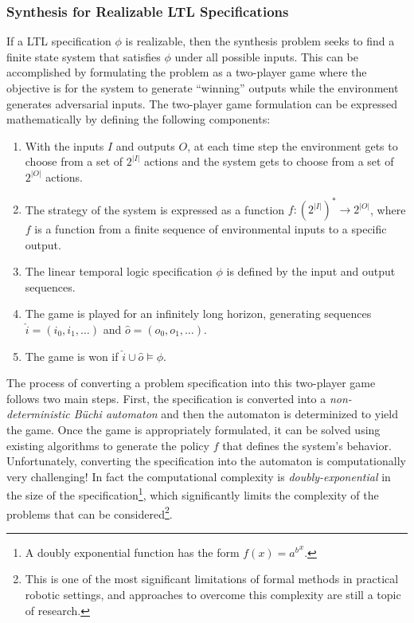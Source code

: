 \subsubsection{Synthesis for Realizable LTL Specifications}
If a LTL specification $\phi$ is realizable, then the synthesis problem seeks to find a finite state system that satisfies $\phi$ under all possible inputs. This can be accomplished by formulating the problem as a two-player game where the objective is for the system to generate ``winning'' outputs while the environment generates adversarial inputs. The two-player game formulation can be expressed mathematically by defining the following components:
\begin{enumerate}
    \item With the inputs $I$ and outputs $O$, at each time step the environment gets to choose from a set of $2^{\lvert I \rvert}$ actions and the system gets to choose from a set of $2^{\lvert O \rvert}$ actions.
    \item The strategy of the system is expressed as a function $f: (2^{\lvert I \rvert})^* \to 2^{\lvert O \rvert}$, where $f$ is a function from a finite sequence of environmental inputs to a specific output.
    \item The linear temporal logic specification $\phi$ is defined by the input and output sequences.
    \item The game is played for an infinitely long horizon, generating sequences $\hat{i} = (i_0, i_1, \dots)$ and $\hat{o} = (o_0, o_1, \dots)$.
    \item The game is won if $\hat{i} \cup \hat{o} \models \phi$.
\end{enumerate}

The process of converting a problem specification into this two-player game follows two main steps. First, the specification is converted into a \textit{non-deterministic B\"{u}chi automaton} and then the automaton is determinized to yield the game.
Once the game is appropriately formulated, it can be solved using existing algorithms to generate the policy $f$ that defines the system's behavior. Unfortunately, converting the specification into the automaton is computationally very challenging! In fact the computational complexity is \textit{doubly-exponential} in the size of the specification\footnote{A doubly exponential function has the form $f(x) = {a^b}^x$.}, which significantly limits the complexity of the problems that can be considered\footnote{This is one of the most significant limitations of formal methods in practical robotic settings, and approaches to overcome this complexity are still a topic of research.}. 

